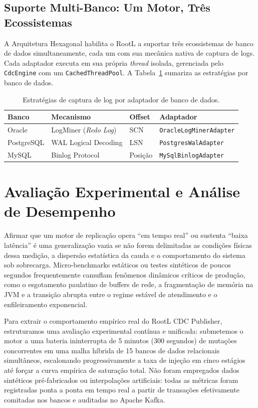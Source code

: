 \documentclass[12pt]{article}
\begin{document}
\subsection{Suporte Multi-Banco: Um Motor, Três Ecossistemas}

A Arquitetura Hexagonal habilita o RootL a suportar três ecossistemas de
banco de dados simultaneamente, cada um com sua mecânica nativa de captura
de logs. Cada adaptador executa em sua própria \textit{thread} isolada,
gerenciada pelo \texttt{CdcEngine} com um \texttt{CachedThreadPool}.
A Tabela~\ref{tab:adapters} sumariza as estratégias por banco de dados.

\begin{table}[H]
\centering
\caption{Estratégias de captura de log por adaptador de banco de dados.}
\label{tab:adapters}
\begin{tabular}{|l|l|l|l|}
\hline
\textbf{Banco} & \textbf{Mecanismo} & \textbf{Offset} & \textbf{Adaptador} \\
\hline
Oracle & LogMiner (\textit{Redo Log}) & SCN & \texttt{OracleLogMinerAdapter} \\
\hline
PostgreSQL & WAL Logical Decoding & LSN & \texttt{PostgresWalAdapter} \\
\hline
MySQL & Binlog Protocol & Posição & \texttt{MySqlBinlogAdapter} \\
\hline
\end{tabular}
\end{table}


\section{Avaliação Experimental e Análise de Desempenho}
\label{sec:eval}

Afirmar que um motor de replicação opera ``em tempo real'' ou sustenta ``baixa latência'' é uma generalização vazia se não forem delimitadas as condições físicas dessa medição, a dispersão estatística da cauda e o comportamento do sistema sob sobrecarga. Micro-benchmarks estáticos ou testes sintéticos de poucos segundos frequentemente camuflam fenômenos dinâmicos críticos de produção, como o esgotamento paulatino de buffers de rede, a fragmentação de memória na JVM e a transição abrupta entre o regime estável de atendimento e o enfileiramento exponencial.

Para extrair o comportamento empírico real do RootL CDC Publisher, estruturamos uma avaliação experimental contínua e unificada: submetemos o motor a uma bateria ininterrupta de 5 minutos (300 segundos) de mutações concorrentes em uma malha híbrida de 15 bancos de dados relacionais simultâneos, escalonando progressivamente a taxa de injeção em cinco estágios até forçar a curva empírica de saturação total. Não foram empregados dados sintéticos pré-fabricados ou interpolações artificiais: todas as métricas foram registradas ponta a ponta em tempo real a partir de transações efetivamente comitadas nos bancos e auditadas no Apache Kafka.
\end{document}
